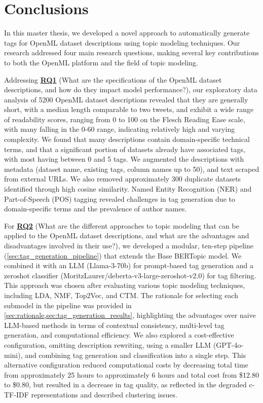 \chapter{Conclusions}\label{chapter:conclusions}

In this master thesis, we developed a novel approach to automatically generate tags for OpenML dataset descriptions using topic modeling techniques. Our research addressed four main research questions, making several key contributions to both the OpenML platform and the field of topic modeling.

Addressing \hyperref[rq1]{\textbf{RQ1}} (What are the specifications of the OpenML dataset descriptions, and how do they impact model performance?), our exploratory data analysis of 5200 OpenML dataset descriptions revealed that they are generally short, with a median length comparable to two tweets, and exhibit a wide range of readability scores, ranging from 0 to 100 on the Flesch Reading Ease scale, with many falling in the 0-60 range, indicating relatively high and varying complexity. We found that many descriptions contain domain-specific technical terms, and that a significant portion of datasets already have associated tags, with most having between 0 and 5 tags. We augmented the descriptions with metadata (dataset name, existing tags, column names up to 50), and text scraped from external URLs. We also removed approximately 300 duplicate datasets identified through high cosine similarity. Named Entity Recognition (NER) and Part-of-Speech (POS) tagging revealed challenges in tag generation due to domain-specific terms and the prevalence of author names.

For \hyperref[rq2]{\textbf{RQ2}} (What are the different approaches to topic modeling that can be applied to the OpenML dataset descriptions, and what are the advantages and disadvantages involved in their use?), we developed a modular, ten-step pipeline (\cref{sec:tag_generation_pipeline}) that extends the Base BERTopic model. We combined it with an LLM (Llama-3-70b) for prompt-based tag generation and a zeroshot classifier (MoritzLaurer/deberta-v3-large-zeroshot-v2.0) for tag filtering. This approach was chosen after evaluating various topic modeling techniques, including LDA, NMF, Top2Vec, and CTM. The rationale for selecting each submodel in the pipeline was provided in \cref{sec:rationale,sec:tag_generation_results}, highlighting the advantages over naive LLM-based methods in terms of contextual consistency, multi-level tag generation, and computational efficiency. We also explored a cost-effective configuration, omitting description rewriting, using a smaller LLM (GPT-4o-mini), and combining tag generation and classification into a single step. This alternative configuration reduced computational costs by decreasing total time from approximately 25 hours to approximately 6 hours and total cost from \$12.80 to \$0.80, but resulted in a decrease in tag quality, as reflected in the degraded c-TF-IDF representations and described clustering issues.


